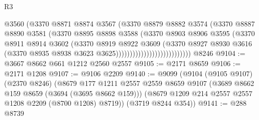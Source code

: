 \begin{lexlean}{R3}
\begin{coremodule}
                                        @3560
                                        (@3370
                                          @8871
                                          @8874
                                          @3567
                                          (@3370
                                            @8879
                                            @8882
                                            @3574
                                            (@3370
                                              @8887
                                              @8890
                                              @3581
                                              (@3370
                                                @8895
                                                @8898
                                                @3588
                                                (@3370
                                                  @8903
                                                  @8906
                                                  @3595
                                                  (@3370
                                                    @8911
                                                    @8914
                                                    @3602
                                                    (@3370
                                                      @8919
                                                      @8922
                                                      @3609
                                                      (@3370
                                                        @8927
                                                        @8930
                                                        @3616
                                                        (@3370
                                                          @8935
                                                          @8938
                                                          @3623
                                                          @3625)))))))))))))))))))))))))))
    @8246
@9104 := @3667 @8662 @661 @1212 @2560 @2557
@9105 := @2171 @8659
@9106 := @2171 @1208
@9107 := @9106 @2209
@9140 := @9099
    (@9104
      (@9105 @9107)
      (@2370 @8246)
      (@8679
        @177
        @1211
        @2557
        @2559
        @8659
        @9107
        (@3689 @8662 @159 @8659 (@3694 (@3695 @8662 @159)))
        (@8679 @1209 @214 @2557 @2557 @1208 @2209 (@8700 @1208) @8719))
      (@3719 @8244 @354))
@9141 := @288 @8739

\end{coremodule}
\end{lexlean}
